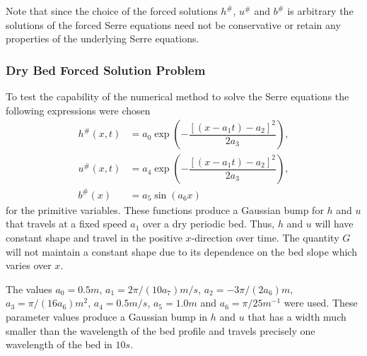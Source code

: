 \documentclass[times]{elsarticle}
\begin{document}
Note that since the choice of the forced solutions $h^\#$, $u^\#$ and $b^\#$ is arbitrary the solutions of the forced Serre equations need not be conservative or retain any properties of the underlying Serre equations. 

\subsubsection{Dry Bed Forced Solution Problem}
To test the capability of the numerical method to solve the Serre equations the following expressions were chosen
\begin{subequations}
	\begin{align}
	\label{eqn:ForcedSolutionxt}
	h^\#(x,t) &=  a_0 \exp\left(-\dfrac{\left[\left(x - a_1 t\right) - a_2\right]^2}{2 a_3}\right), \\
	u^\#(x,t) &= a_4 \exp\left(-\dfrac{\left[\left(x - a_1 t\right) - a_2\right]^2}{2 a_3}\right), \\
	b^\#(x) &= a_5 \sin\left(a_6 x\right)
	\end{align}
\end{subequations}
for the primitive variables. These functions produce a Gaussian bump for $h$ and $u$ that travels at a fixed speed $a_1$ over a dry periodic bed. Thus, $h$ and $u$ will have constant shape and travel in the positive $x$-direction over time. The quantity $G$ will not maintain a constant shape due to its dependence on the bed slope which varies over $x$.

The values $a_0 = 0.5m$, $a_1 = 2 \pi / \left(10 a_7\right) m/s$, $a_2 =- 3\pi/ \left(2 a_6\right)m$, $a_3 = \pi / (16 a_6) m^2$, $a_4 = 0.5 m/s$, $a_5 = 1.0 m$ and $a_6 = \pi / 25 m^{-1}$ were used. These parameter values produce a Gaussian bump in $h$ and $u$ that has a width much smaller than the wavelength of the bed profile and travels precisely one wavelength of the bed in $10s$. 
\end{document}
